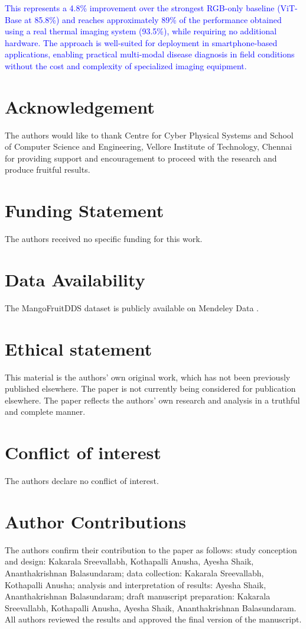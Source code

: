 \documentclass[utf8]{FrontiersinHarvard} %
\begin{document}
\textcolor{blue}{This represents a 4.8\% improvement over the strongest RGB-only baseline (ViT-Base at 85.8\%) and reaches approximately 89\% of the performance obtained using a real thermal imaging system (93.5\%), while requiring no additional hardware. The approach is well-suited for deployment in smartphone-based applications, enabling practical multi-modal disease diagnosis in field conditions without the cost and complexity of specialized imaging equipment.}


\section*{Acknowledgement}
The authors would like to thank Centre for Cyber Physical Systems and School of Computer Science and Engineering, Vellore Institute of Technology, Chennai for providing support and encouragement to proceed with the research and produce fruitful results.

\section*{Funding Statement}
The authors received no specific funding for this work.

\section*{Data Availability}
The MangoFruitDDS dataset is publicly available on Mendeley Data \cite{MendeleyDataset}.

\section*{Ethical statement}
This material is the authors' own original work, which has not been previously published elsewhere. The paper is not currently being considered for publication elsewhere. The paper reflects the authors' own research and analysis in a truthful and complete manner.

\section*{Conflict of interest}
The authors declare no conflict of interest.

\section*{Author Contributions}
The authors confirm their contribution to the paper as follows: study conception and design: Kakarala Sreevallabh, Kothapalli Anusha, Ayesha Shaik, Ananthakrishnan Balasundaram; data collection: Kakarala Sreevallabh, Kothapalli Anusha; analysis and interpretation of results: Ayesha Shaik, Ananthakrishnan Balasundaram; draft manuscript preparation: Kakarala Sreevallabh, Kothapalli Anusha, Ayesha Shaik, Ananthakrishnan Balasundaram. All authors reviewed the results and approved the final version of the manuscript.
\end{document}
